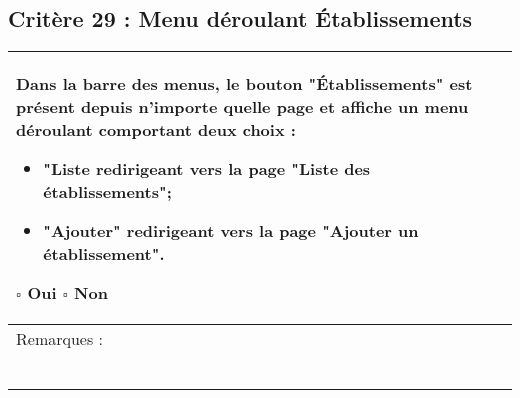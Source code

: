   		
  			\subsection*{Critère 29 : Menu déroulant Établissements}
	
	\begin{center}
    	 		\begin{tabular}[h]{|p{}|}
			\hline
				Dans la barre des menus, le bouton "Établissements" est présent depuis n'importe quelle page et affiche un menu déroulant comportant deux choix :   
				\begin{itemize}
					\item "Liste redirigeant vers la page "Liste des établissements";
					\item "Ajouter" redirigeant vers la page "Ajouter un établissement".
				\end{itemize}
				$\square$ Oui  \hfill \hfill $\square$ Non \\\hline Remarques : \\ ~\\
			 \\\hline
     		\end{tabular}
  		\end{center}
  		
  		
  	